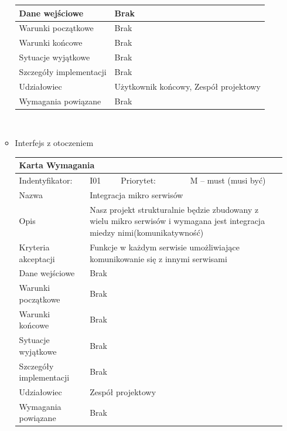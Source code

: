 \documentclass[a4paper,11pt]{report}
\begin{document}
\begin{itemize}
\begin{itemize}
\begin{tabular}{|p{3cm}|p{2cm}|p{2cm}|p{6cm}|}
		Dane wejściowe & \multicolumn{3}{|p{10 cm}|}{Brak}\\
		\hline
		Warunki początkowe & \multicolumn{3}{|p{10 cm}|}{Brak}\\
		\hline
		Warunki końcowe & \multicolumn{3}{|p{10 cm}|}{Brak}\\
		\hline
		Sytuacje wyjątkowe & \multicolumn{3}{|p{10 cm}|}{Brak}\\
		\hline
		Szczegóły implementacji & \multicolumn{3}{|p{10 cm}|}{Brak}\\
		\hline
		Udziałowiec & \multicolumn{3}{|p{10 cm}|}{Użytkownik końcowy, Zespół projektowy}\\
		\hline
		Wymagania powiązane & \multicolumn{3}{|p{10 cm}|}{Brak}\\
		\hline
		\end{tabular}\\
		\item Interfejs z otoczeniem\\
		\begin{tabular}{|p{3cm}|p{2cm}|p{2cm}|p{6cm}|}
		\hline
		\multicolumn{4}{|p{12 cm}|}{Karta Wymagania}\\
		\hline
		Indentyfikator: & I01 & Priorytet: & M – must (musi być)\\
		\hline
		Nazwa & \multicolumn{3}{|p{10 cm}|}{Integracja mikro serwisów}\\
		\hline
		Opis & \multicolumn{3}{|p{10 cm}|}{Nasz projekt strukturalnie będzie zbudowany z wielu mikro serwisów i wymagana jest integracja miedzy nimi(komunikatywność)}\\
		\hline
		Kryteria akceptacji & \multicolumn{3}{|p{10 cm}|}{Funkcje w każdym serwisie umożliwiające komunikowanie się z innymi serwisami}\\
		\hline
		Dane wejściowe & \multicolumn{3}{|p{10 cm}|}{Brak}\\
		\hline
		Warunki początkowe & \multicolumn{3}{|p{10 cm}|}{Brak}\\
		\hline
		Warunki końcowe & \multicolumn{3}{|p{10 cm}|}{Brak}\\
		\hline
		Sytuacje wyjątkowe & \multicolumn{3}{|p{10 cm}|}{Brak}\\
		\hline
		Szczegóły implementacji & \multicolumn{3}{|p{10 cm}|}{Brak}\\
		\hline
		Udziałowiec & \multicolumn{3}{|p{10 cm}|}{Zespół projektowy}\\
		\hline
		Wymagania powiązane & \multicolumn{3}{|p{10 cm}|}{Brak}\\
		\hline
		\end{tabular}\\

\end{itemize}
\end{itemize}
\end{document}
